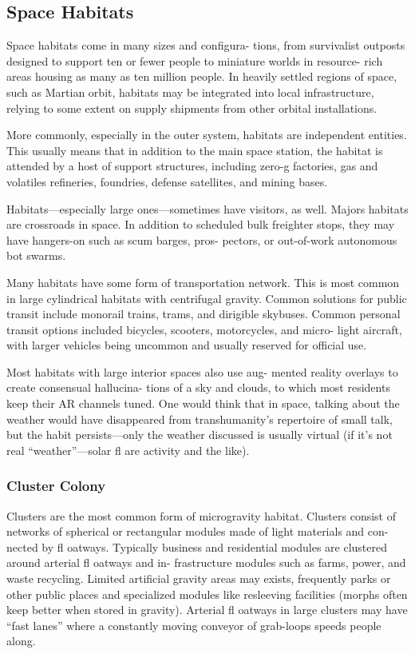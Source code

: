 \subsection{Space Habitats}

Space habitats come in many sizes and configura-
tions, from survivalist outposts designed to support 
ten or fewer people to miniature worlds in resource-
rich areas housing as many as ten million people. In 
heavily settled regions of space, such as Martian orbit, 
habitats may be integrated into local infrastructure, 
relying to some extent on supply shipments from other 
orbital installations.

More commonly, especially in the outer system, 
habitats are independent entities. This usually means 
that in addition to the main space station, the habitat 
is attended by a host of support structures, including 
zero-g factories, gas and volatiles refineries, foundries, 
defense satellites, and mining bases.

Habitats—especially large ones—sometimes have 
visitors, as well. Majors habitats are crossroads in 
space. In addition to scheduled bulk freighter stops, 
they may have hangers-on such as scum barges, pros-
pectors, or out-of-work autonomous bot swarms.

Many habitats have some form of transportation 
network. This is most common in large cylindrical 
habitats with centrifugal gravity. Common solutions 
for public transit include monorail trains, trams, and 
dirigible skybuses. Common personal transit options 
included bicycles, scooters, motorcycles, and micro-
light aircraft, with larger vehicles being uncommon 
and usually reserved for official use.

Most habitats with large interior spaces also use aug-
mented reality overlays to create consensual hallucina-
tions of a sky and clouds, to which most residents keep 
their AR channels tuned. One would think that in space, 
talking about the weather would have disappeared from 
transhumanity's repertoire of small talk, but the habit 
persists—only the weather discussed is usually virtual (if 
it's not real ``weather''—solar fl are activity and the like).

\subsubsection{Cluster Colony}

Clusters are the most common form of microgravity 
habitat. Clusters consist of networks of spherical or 
rectangular modules made of light materials and con-
nected by fl oatways. Typically business and residential 
modules are clustered around arterial fl oatways and in-
frastructure modules such as farms, power, and waste 
recycling. Limited artificial gravity areas may exists, 
frequently parks or other public places and specialized 
modules like resleeving facilities (morphs often keep 
better when stored in gravity). Arterial fl oatways in 
large clusters may have ``fast lanes'' where a constantly 
moving conveyor of grab-loops speeds people along.


